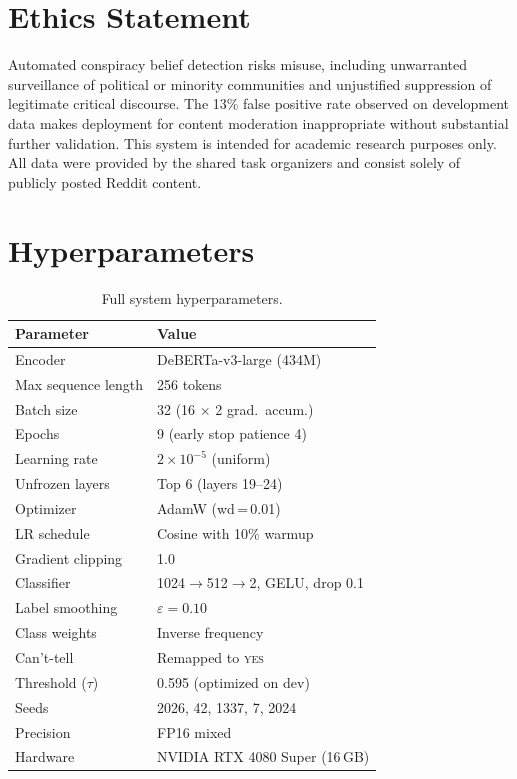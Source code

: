 \documentclass[11pt]{article}
\begin{document}
\section*{Ethics Statement}

Automated conspiracy belief detection risks misuse, including unwarranted
surveillance of political or minority communities and unjustified
suppression of legitimate critical discourse.
The 13\% false positive rate observed on development data makes
deployment for content moderation inappropriate without substantial
further validation.
This system is intended for academic research purposes only.
All data were provided by the shared task organizers and consist solely
of publicly posted Reddit content.



\appendix

\section{Hyperparameters}
\label{app:hyperparams}

\begin{table}[h]
\centering\small
\begin{tabular}{@{}ll@{}}
\toprule
\textbf{Parameter} & \textbf{Value} \\
\midrule
Encoder             & DeBERTa-v3-large (434M) \\
Max sequence length & 256 tokens \\
Batch size          & 32 (16 $\times$ 2 grad.\ accum.) \\
Epochs              & 9 (early stop patience 4) \\
Learning rate       & $2{\times}10^{-5}$ (uniform) \\
Unfrozen layers     & Top 6 (layers 19--24) \\
Optimizer           & AdamW (wd\,=\,0.01) \\
LR schedule         & Cosine with 10\% warmup \\
Gradient clipping   & 1.0 \\
Classifier          & 1024$\to$512$\to$2, GELU, drop 0.1 \\
Label smoothing     & $\varepsilon = 0.10$ \\
Class weights       & Inverse frequency \\
Can't-tell          & Remapped to \textsc{yes} \\
Threshold ($\tau$)  & 0.595 (optimized on dev) \\
Seeds               & 2026, 42, 1337, 7, 2024 \\
Precision           & FP16 mixed \\
Hardware            & NVIDIA RTX 4080 Super (16\,GB) \\
\bottomrule
\end{tabular}
\caption{Full system hyperparameters.}
\label{tab:hyperparams}
\end{table}
\end{document}
